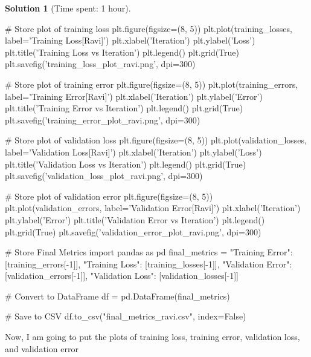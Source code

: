 \documentclass[11pt, reqno, letterpaper, twoside]{amsart}
\theoremstyle{plain}
\theoremstyle{definition}
\newtheorem{solution}[theorem]{Solution}
\begin{document}
\begin{solution}[Time spent: 1 hour]
\begin{enumerate}
\begin{python}
# Store plot of training loss
plt.figure(figsize=(8, 5))
plt.plot(training_losses, label='Training Loss[Ravi]')
plt.xlabel('Iteration')
plt.ylabel('Loss')
plt.title('Training Loss vs Iteration')
plt.legend()
plt.grid(True)
plt.savefig('training_loss_plot_ravi.png', dpi=300)

# Store plot of training error
plt.figure(figsize=(8, 5))
plt.plot(training_errors, label='Training Error[Ravi]')
plt.xlabel('Iteration')
plt.ylabel('Error')
plt.title('Training Error vs Iteration')
plt.legend()
plt.grid(True)
plt.savefig('training_error_plot_ravi.png', dpi=300)

# Store plot of validation loss
plt.figure(figsize=(8, 5))
plt.plot(validation_losses, label='Validation Loss[Ravi]')
plt.xlabel('Iteration')
plt.ylabel('Loss')
plt.title('Validation Loss vs Iteration')
plt.legend()
plt.grid(True)
plt.savefig('validation_loss_plot_ravi.png', dpi=300)

# Store plot of validation error
plt.figure(figsize=(8, 5))
plt.plot(validation_errors, label='Validation Error[Ravi]')
plt.xlabel('Iteration')
plt.ylabel('Error')
plt.title('Validation Error vs Iteration')
plt.legend()
plt.grid(True)
plt.savefig('validation_error_plot_ravi.png', dpi=300)

# Store Final Metrics
import pandas as pd
final_metrics = {
    "Training Error": [training_errors[-1]],
    "Training Loss": [training_losses[-1]],
    "Validation Error": [validation_errors[-1]],
    "Validation Loss": [validation_losses[-1]]
}

# Convert to DataFrame
df = pd.DataFrame(final_metrics)

# Save to CSV
df.to_csv("final_metrics_ravi.csv", index=False)
\end{python}

Now, I am going to put the plots of training loss, training error, validation loss, and validation error


\end{enumerate}
\end{solution}
\end{document}
